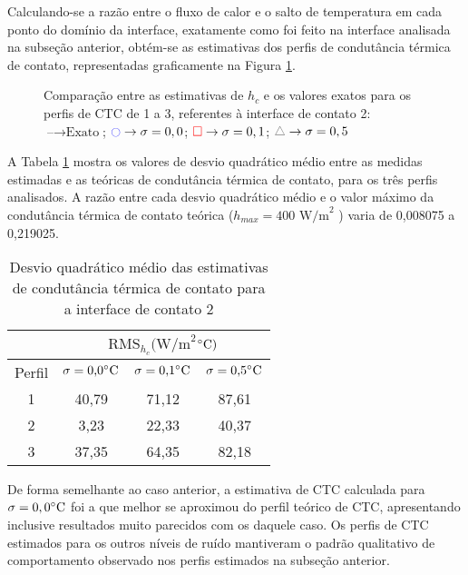 Calculando-se a razão entre o fluxo de calor e o salto de temperatura em cada ponto do domínio da interface, exatamente como foi feito na interface analisada na subseção anterior, obtém-se as estimativas dos perfis de condutância térmica de contato, representadas graficamente na Figura \ref{figura_ctc_interface_02}.
\begin{figure}[H]
	\caption{Comparação entre as estimativas de $h_c$ e os valores exatos para os perfis de CTC de 1 a 3, referentes à interface de contato 2: $\text{--} \rightarrow \text{Exato}$; $\textcolor{blue}{\ocircle} \rightarrow \sigma = 0,0$; $\textcolor{red}{\square} \rightarrow \sigma = 0,1$; $\textcolor{gray}{\triangle} \rightarrow \sigma = 0,5$}
	\label{figura_ctc_interface_02}
\end{figure}

A Tabela \ref{tabela_rms_ctc_interface_2} mostra os valores de desvio quadrático médio entre as medidas estimadas e as teóricas de condutância térmica de contato, para os três perfis analisados. A razão entre cada desvio quadrático médio e o valor máximo da condutância térmica de contato teórica ($h_{max} = 400 \text{ W/m}^2$ \celsius) varia de 0,008075 a 0,219025.
\begin{table}[H]
	\centering
	\caption{Desvio quadrático médio das estimativas de condutância térmica de contato para a interface de contato 2}
	\begin{tabular}{c|c|c|c|}
		\cline{2-4}
		& \multicolumn{3}{c|}{$\text{RMS}_{h_c}(\text{W/m}^{2}$$\celsius)$} \\ \hline
		\multicolumn{1}{|c|}{Perfil} & $\sigma = \text{0,0}\celsius$   & $\sigma = \text{0,1}\celsius$    & $\sigma = \text{0,5}\celsius$  \\ \hline
		\multicolumn{1}{|c|}{1}      & 40,79       &  71,12      & 87,61      \\ \hline
		\multicolumn{1}{|c|}{2}      & 3,23       & 22,33       &  40,37     \\ \hline
		\multicolumn{1}{|c|}{3}      & 37,35       & 64,35       & 82,18      \\ \hline
	\end{tabular}
	\label{tabela_rms_ctc_interface_2}
\end{table}

De forma semelhante ao caso anterior, a estimativa de CTC calculada para $\sigma = 0,0\celsius$ foi a que melhor se aproximou do perfil teórico de CTC, apresentando inclusive resultados muito parecidos com os daquele caso. Os perfis de CTC estimados para os outros níveis de ruído mantiveram o padrão qualitativo de comportamento observado nos perfis estimados na subseção anterior.